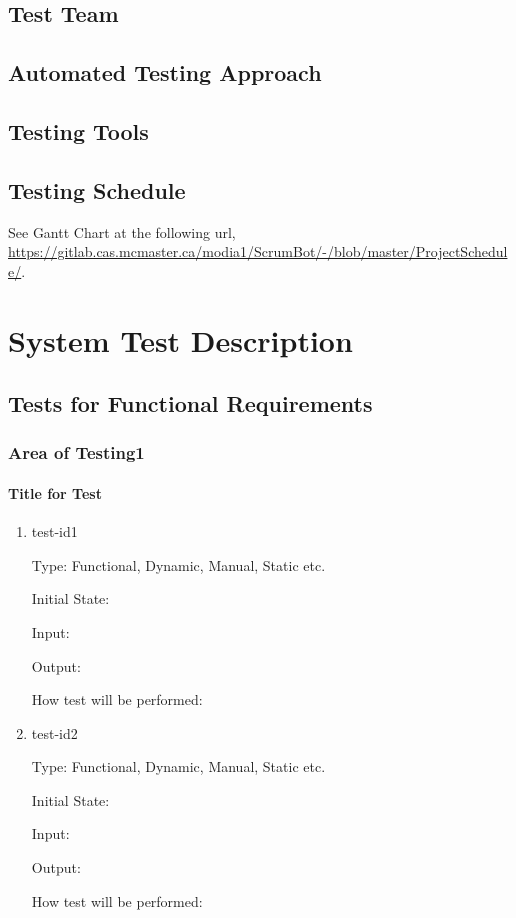 \documentclass[12pt, titlepage]{article}
\begin{document}
\subsection{Test Team}


\subsection{Automated Testing Approach}


\subsection{Testing Tools}


\subsection{Testing Schedule}
See Gantt Chart at the following url, \url{https://gitlab.cas.mcmaster.ca/modia1/ScrumBot/-/blob/master/ProjectSchedule/}.

\section{System Test Description}
    
\subsection{Tests for Functional Requirements}

\subsubsection{Area of Testing1}
        
\paragraph{Title for Test}

\begin{enumerate}

\item{test-id1\\}

Type: Functional, Dynamic, Manual, Static etc.
                    
Initial State: 
                    
Input: 
                    
Output: 
                    
How test will be performed: 
                    
\item{test-id2\\}

Type: Functional, Dynamic, Manual, Static etc.
                    
Initial State: 
                    
Input: 
                    
Output: 
                    
How test will be performed: 

\end{enumerate}
\end{document}
